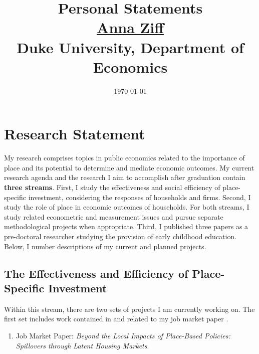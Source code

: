 

\setlength{\parskip}{\baselineskip}%
\setlength{\parindent}{0pt}%
\setlength{\droptitle}{-5em}



\title{\normalsize \textbf{Personal Statements} \\ \href{https://aziff.github.io}{Anna Ziff} \\ Duke University, Department of Economics}
\date{\vspace{-2.25cm} \normalsize \today}
\maketitle

\section{Research Statement}

My research comprises topics in public economics related to the importance of place and its potential to determine and mediate economic outcomes. My current research agenda and the research I aim to accomplish after graduation contain \textbf{three streams}. First, I study the effectiveness and social efficiency of place-specific investment, considering the responses of households and firms. Second, I study the role of place in economic outcomes of households. For both streams, I study related econometric and measurement issues and pursue separate methodological projects when appropriate. Third, I published three papers as a pre-doctoral researcher studying the provision of early childhood education. Below, I number descriptions of my current and planned projects.

\subsection{The Effectiveness and Efficiency of Place-Specific Investment}

Within this stream, there are two sets of projects I am currently working on. The first set includes work contained in and related to my job market paper \citep{ziff_local_2023}. 


\begin{enumerate}
\item Job Market Paper: \textit{Beyond the Local Impacts of Place-Based Policies: Spillovers through Latent Housing Markets}.
\end{enumerate}

